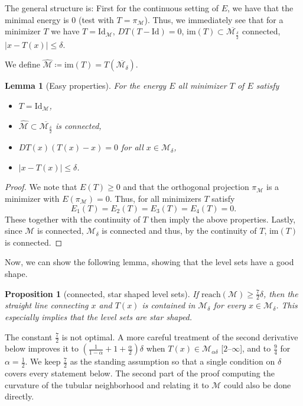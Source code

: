 \documentclass[11pt]{amsart}%
\theoremstyle{plain}
\newtheorem{proposition}[definition]{Proposition}
\newtheorem{lemma}[definition]{Lemma}
\newcommand{\1}{\mathbf{1}}
\newcommand{\M}{\mathcal{M}}
\begin{document}
The general structure is: First for the continuous setting of $E$, we have that the minimal energy is $0$ (test with $T=\pi_\M$). Thus, we immediately see that for a minimizer $T$ we have $T=\text{Id}_\M$, $DT(T-\text{Id})=0$, $\text{im}(T)\subset \overline{\M_{\frac{\delta}{2}}}$ connected, $|x-T(x)|\leq\delta$. 

We define $\widehat{\M}\coloneqq\text{im}(T)=T(\overline{\M_\delta})$.

\begin{lemma}[Easy properties]
    \label{Lem:EasyProp}
    For the energy $E$ all minimizer $T$ of $E$ satisfy
    \begin{itemize}
        \item $T=\text{Id}_\M$,
        \item $\widehat{\M}\subset \overline{\M_\frac{\delta}{2}}$ is connected,
        \item $DT(x)(T(x)-x)=0$ for all $x\in \M_\delta$,
        \item $|x-T(x)|\leq \delta$.
    \end{itemize}
\end{lemma}

\begin{proof}
    We note that $E(T)\geq 0$ and that the orthogonal projection $\pi_\M$ is a minimizer with $E(\pi_\M)=0$. Thus, for all minimizers $T$ satisfy
    $$E_1(T)=E_2(T)=E_3(T)=E_4(T)=0.$$
    These together with the continuity of $T$ then imply the above properties. Lastly, since $\M$ is connected, $\M_\delta$ is connected and thus, by the continuity of $T$, $\text{im}(T)$ is connected.
\end{proof}

Now, we can show the following lemma, showing that the level sets have a good shape.

\begin{proposition}[connected, star shaped level sets]
    \label{Prop:StarShaped}
    If $\text{reach}(\M)\geq\frac{7}{2}\delta$, then the straight line connecting $x$ and $T(x)$ is contained in $\M_\delta$ for every $x\in \M_\delta$. This especially implies that the level sets are star shaped.
\end{proposition}

The constant $\frac{7}{2}$ is not optimal. A more careful treatment of the second derivative below improves it to $\left(\frac{1}{1-\alpha}+1+\frac{\alpha}{2}\right)\delta$ when $T(x)\in \M_{\alpha\delta}$ [$2$--$\infty$], and to $\frac{9}{4}$ for $\alpha=\frac{1}{2}$. We keep $\frac{7}{2}$ as the standing assumption so that a single condition on $\delta$ covers every statement below. The second part of the proof computing the curvature of the tubular neighborhood and relating it to $\M$ could also be done directly.
\end{document}
